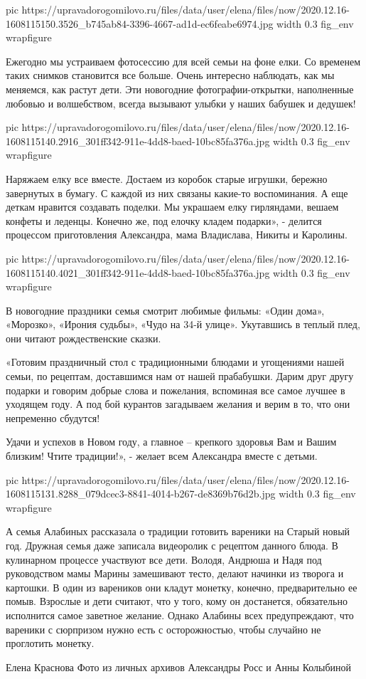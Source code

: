 \ifcmt
  pic https://upravadorogomilovo.ru/files/data/user/elena/files/now/2020.12.16-1608115150.3526_b745ab84-3396-4667-ad1d-ec6feabe6974.jpg
  width 0.3
  fig_env wrapfigure
\fi


Ежегодно мы устраиваем фотосессию для всей семьи на фоне елки. Со временем
таких снимков становится все больше. Очень интересно наблюдать, как мы
меняемся, как растут дети. Эти новогодние фотографии-открытки, наполненные
любовью и волшебством, всегда вызывают улыбки у наших бабушек и дедушек!

\ifcmt
  pic https://upravadorogomilovo.ru/files/data/user/elena/files/now/2020.12.16-1608115140.2916_301ff342-911e-4dd8-baed-10bc85fa376a.jpg
  width 0.3
  fig_env wrapfigure
\fi


Наряжаем елку все вместе. Достаем из коробок старые игрушки, бережно завернутых
в бумагу. С каждой из них связаны какие-то воспоминания. А еще деткам нравится
создавать поделки. Мы украшаем елку гирляндами, вешаем конфеты и леденцы.
Конечно же, под елочку кладем подарки», - делится процессом приготовления
Александра, мама Владислава, Никиты и Каролины.

\ifcmt
  pic https://upravadorogomilovo.ru/files/data/user/elena/files/now/2020.12.16-1608115140.4021_301ff342-911e-4dd8-baed-10bc85fa376a.jpg
  width 0.3
  fig_env wrapfigure
\fi


В новогодние праздники семья смотрит любимые фильмы: «Один дома», «Морозко»,
«Ирония судьбы», «Чудо на 34-й улице». Укутавшись в теплый плед, они читают
рождественские сказки.

«Готовим праздничный стол с традиционными блюдами и угощениями нашей семьи, по
рецептам, доставшимся нам от нашей прабабушки. Дарим друг другу подарки и
говорим добрые слова и пожелания, вспоминая все самое лучшее в уходящем году. А
под бой курантов загадываем желания и верим в то, что они непременно сбудутся!

Удачи и успехов в Новом году, а главное – крепкого здоровья Вам и Вашим
близким! Чтите традиции!», - желает всем Александра вместе с детьми.

\ifcmt
  pic https://upravadorogomilovo.ru/files/data/user/elena/files/now/2020.12.16-1608115131.8288_079dcec3-8841-4014-b267-de8369b76d2b.jpg
  width 0.3
  fig_env wrapfigure
\fi


А семья Алабиных рассказала о традиции готовить вареники на Старый новый год.
Дружная семья даже записала видеоролик с рецептом данного блюда. В кулинарном
процессе участвуют все дети. Володя, Андрюша и Надя под руководством мамы
Марины замешивают тесто, делают начинки из творога и картошки. В один из
вареников они кладут монетку, конечно, предварительно ее помыв. Взрослые и дети
считают, что у того, кому он достанется, обязательно исполнится самое заветное
желание. Однако Алабины всех предупреждают, что вареники с сюрпризом нужно есть
с осторожностью, чтобы случайно не проглотить монетку.

Елена Краснова Фото из личных архивов Александры Росс и Анны Колыбиной



